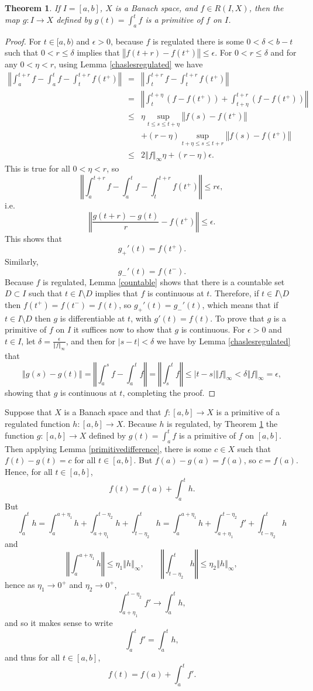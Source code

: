 \documentclass{article}
\newcommand{\norm}[1]{\left\Vert #1 \right\Vert}
\newtheorem{theorem}{Theorem}
\theoremstyle{definition}
\begin{document}
\begin{theorem}
If $I=[a,b]$, $X$ is a Banach space,  and $f \in R(I,X)$, then
the map $g:I \to X$ defined by $g(t)=\int_a^t f$ is a primitive of $f$ on $I$.
\label{primitive}
\end{theorem}
\begin{proof}
For $t \in [a,b)$ and $\epsilon>0$, because $f$ is regulated there is some $0<\delta<b-t$ such that
$0<r \leq \delta$ implies that $\norm{f(t+r)-f(t^+)} \leq \epsilon$. For $0<r \leq \delta$ and for
any $0<\eta<r$,
using Lemma \ref{chaslesregulated} we have
\begin{eqnarray*}
\norm{\int_a^{t+r} f - \int_a^t f - \int_t^{t+r} f(t^+)}&=&\norm{\int_t^{t+r}f - \int_t^{t+r} f(t^+)}\\
&=&\norm{\int_t^{t+\eta} (f-f(t^+))+\int_{t+\eta}^{t+r} (f-f(t^+))}\\
&\leq&\eta \sup_{t \leq s \leq t+\eta} \norm{f(s)-f(t^+)}\\
&&+ (r-\eta)\sup_{t+\eta \leq s \leq t+r} \norm{f(s)-f(t^+)}\\
&\leq& 2 \norm{f}_\infty \eta + (r-\eta)\epsilon.
\end{eqnarray*}
This is true for all $0<\eta<r$, so
\[
\norm{\int_a^{t+r} f - \int_a^t f - \int_t^{t+r} f(t^+)} \leq r\epsilon,
\]
i.e.
\[
\norm{\frac{g(t+r)- g(t)}{r} - f(t^+)} \leq \epsilon.
\]
This shows that
\[
g_+'(t)=f(t^+).
\]
Similarly, 
\[
g_-'(t)=f(t^-).
\]
Because $f$ is regulated, Lemma \ref{countable} shows that there is a countable set $D \subset I$ such that
$t \in I \setminus D$ implies that $f$ is continuous at $t$. Therefore, if $t \in I \setminus D$ then
$f(t^+)=f(t^-)=f(t)$, so $g_+'(t)=g_-'(t)$, which means that if $t \in I \setminus D$ then $g$
is differentiable at $t$, with $g'(t)=f(t)$. To prove that $g$ is a primitive of $f$ on $I$ it suffices now to show that
$g$ is continuous. For $\epsilon>0$ and $t \in I$, let $\delta=\frac{\epsilon}{\norm{f}_\infty}$, and then
for $|s-t| < \delta$ we have by Lemma \ref{chaslesregulated} that
\[
\norm{g(s)-g(t)} =\norm{\int_a^s f - \int_a^t f} = \norm{\int_s^t f} \leq |t-s| \norm{f}_\infty < \delta \norm{f}_\infty=\epsilon,
\]
showing that $g$ is continuous at $t$, completing the proof.
\end{proof}

Suppose that   $X$ is a Banach space and that $f:[a,b] \to X$ is a primitive of a regulated function $h:[a,b] \to X$.
Because $h$ is regulated, 
by Theorem \ref{primitive} the function $g:[a,b] \to X$ defined by
$g(t)=\int_a^t f$ is a primitive of $f$ on $[a,b]$. Then applying Lemma \ref{primitivedifference}, there is some $c \in X$ such that
$f(t)-g(t)=c$ for all $t \in [a,b]$. But $f(a)-g(a)=f(a)$, so $c=f(a)$. Hence, for all $t \in [a,b]$,
\[
f(t) = f(a) + \int_a^t h.
\]
But 
\[
\int_a^t h = \int_a^{a+\eta_1} h + \int_{a+\eta_1}^{t-\eta_2} h + \int_{t-\eta_2}^t h
=\int_a^{a+\eta_1} h + \int_{a+\eta_1}^{t-\eta_2} f' + \int_{t-\eta_2}^t h
\]
and
\[
\norm{\int_a^{a+\eta_1} h} \leq \eta_1 \norm{h}_\infty, \qquad \norm{\int_{t-\eta_2}^t h} \leq \eta_2 \norm{h}_\infty,
\]
hence as $\eta_1 \to 0^+$ and $\eta_2 \to 0^+$,
\[
 \int_{a+\eta_1}^{t-\eta_2} f'  \to \int_a^t h,
\]
and so it makes sense to write
\[
 \int_a^t f'  = \int_a^t h,
\]
and thus for all $t \in [a,b]$,
\[
f(t)=f(a)+\int_a^t f'.
\]
\end{document}
